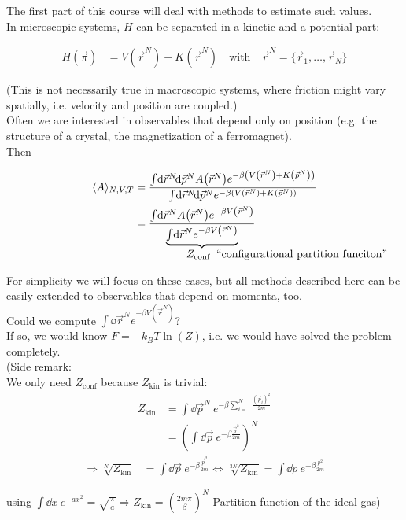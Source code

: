 The first part of this course will deal with methods to estimate such values.\\
In microscopic systems, $H$ can be separated in a kinetic and a potential part:

\begin{align}
	H(\vec{\pi}) &= V(\vec{r}^N) + K(\vec{r}^N) \quad\text{with}\quad \vec{r}^N = \{\vec{r}_1,\dots,\vec{r}_N\}
\end{align}

(This is not necessarily true in macroscopic systems, where friction might vary spatially, i.e. velocity and position are coupled.)\\

Often we are interested in observables that depend only on position (e.g. the structure of a crystal, the magnetization of a ferromagnet).\\
Then

\begin{align}
	\langle A \rangle_{N, V, T} &= \frac{\int\dd\vec{r}^N\dd\vec{p}^N A\left(\vec{r}^N\right) e^{-\beta\left(V\left(\vec{r}^N\right) + K\left(\vec{p}^N\right)\right)}}{\int\dd\vec{r}^N\dd\vec{p}^N e^{-\beta\left(V\left(\vec{r}^N\right) + K\left(\vec{p}^N\right)\right)}}\\
	&= \frac{\int\dd\vec{r}^N A\left(\vec{r}^N\right) e^{-\beta V\left(\vec{r}^N\right)}}{\underbrace{\textstyle\int\dd\vec{r}^N e^{-\beta V\left(\vec{r}^N\right)}}_{\parbox{1cm}{$Z_\text{conf}\ \text{ ``configurational partition funciton''}$}}}
\end{align}

For simplicity we will focus on these cases, but all methods described here can be easily extended to observables that depend on momenta, too.\\
Could we compute $\int\dd\vec{r}^N e^{-\beta V\left(\vec{r}^N\right)}$?\\
If so, we would know $F = -k_B T \ln(Z)$, i.e. we would have solved the problem completely.\\

(Side remark:\\
We only need $Z_\text{conf}$ because $Z_\text{kin}$ is trivial:
\begin{align}
	Z_\text{kin} &= \int\dd\vec{p}^N\ e^{-\beta\sum\limits_{i=1}^{N}\frac{\left(\vec{p}_i\right)^2}{2m}}\\
	&= \left(\int\dd\vec{p}\ e^{-\beta\frac{\vec{p}^2}{2m}}\right)^N
\end{align}
\begin{align}
	\Rightarrow \sqrt[N]{Z_\text{kin}} &=  \int\dd\vec{p}\ e^{-\beta\frac{\vec{p}^2}{2m}} \Leftrightarrow\sqrt[3N]{Z_\text{kin}} = \int\dd p\ e^{-\beta\frac{p^2}{2m}}
\end{align}

using $\int\dd x\ e^{-ax^2} = \sqrt{\frac{\pi}{a}}\Rightarrow Z_\text{kin} = \left(\frac{2m\pi}{\beta}\right)^N$ Partition function of the ideal gas)